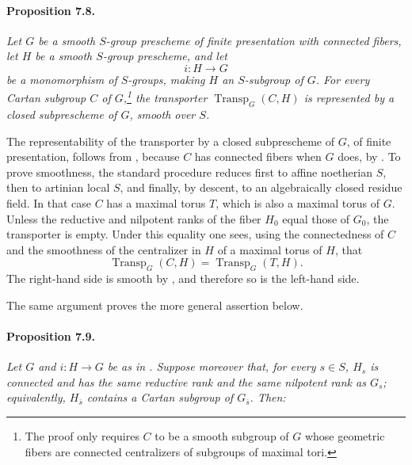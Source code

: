 \paragraph{\textbf{Proposition 7.8.}}
\emph{Let \(G\) be a smooth \(S\)-group prescheme of finite
presentation with connected fibers, let \(H\) be a smooth
\(S\)-group prescheme, and let}
\[
  i:H\longrightarrow G
\]
\emph{be a monomorphism of \(S\)-groups, making \(H\) an
\(S\)-subgroup of \(G\). For every Cartan subgroup
\(C\) of \(G\),\footnote{The proof only requires \(C\) to be a
smooth subgroup of \(G\) whose geometric fibers are connected
centralizers of subgroups of maximal tori.} the transporter
\(\operatorname{Transp}_G(C,H)\) is represented by a closed
subprescheme of \(G\), smooth over \(S\).}

The representability of the transporter by a closed subprescheme of
\(G\), of finite presentation, follows from , because \(C\)
has connected fibers when \(G\) does, by . To prove smoothness,
the standard procedure reduces first to affine noetherian \(S\),
then to artinian local \(S\), and finally, by descent, to an
algebraically closed residue field. In that case \(C\) has a maximal
torus \(T\), which is also a maximal torus of \(G\). Unless the
reductive and nilpotent ranks of the fiber \(H_0\) equal those of
\(G_0\), the transporter is empty. Under this equality one sees,
using the connectedness of \(C\) and the smoothness of the
centralizer in \(H\) of a maximal torus of \(H\), that
\[
  \operatorname{Transp}_G(C,H)
  =
  \operatorname{Transp}_G(T,H).
\]
The right-hand side is smooth by , and therefore so is the
left-hand side.

The same argument proves the more general assertion
 below.

\paragraph{\textbf{Proposition 7.9.}}
\emph{Let \(G\) and \(i:H\to G\) be as in . Suppose moreover
that, for every \(s\in S\), \(H_s\) is connected and has the same
reductive rank and the same nilpotent rank as \(G_s\); equivalently,
\(H_{\bar s}\) contains a Cartan subgroup of \(G_{\bar s}\). Then:}

